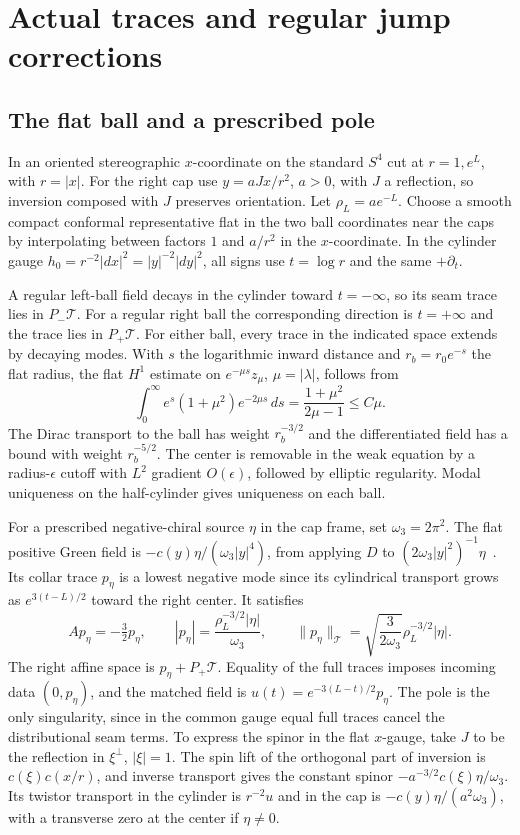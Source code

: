\documentclass[11pt]{article}
\theoremstyle{remark}
\begin{document}
\section{Actual traces and regular jump corrections}

\subsection{The flat ball and a prescribed pole}
In an oriented stereographic \(x\)-coordinate on the standard \(S^4\) cut at \(r=1,e^L\), with \(r=|x|\). For the right cap use \(y=aJx/r^2\), \(a>0\), with \(J\) a reflection, so inversion composed with \(J\) preserves orientation. Let \(\rho_L=ae^{-L}\). Choose a smooth compact conformal representative flat in the two ball coordinates near the caps by interpolating between factors \(1\) and \(a/r^2\) in the \(x\)-coordinate. In the cylinder gauge \(h_0=r^{-2}|dx|^2=|y|^{-2}|dy|^2\), all signs use \(t=\log r\) and the same \(+\partial_t\).

A regular left-ball field decays in the cylinder toward \(t=-\infty\), so its seam trace lies in \(P_-\mathcal T\). For a regular right ball the corresponding direction is \(t=+\infty\) and the trace lies in \(P_+\mathcal T\). For either ball, every trace in the indicated space extends by decaying modes. With \(s\) the logarithmic inward distance and \(r_b=r_0e^{-s}\) the flat radius, the flat \(H^1\) estimate on \(e^{-\mu s}z_\mu\), \(\mu=|\lambda|\), follows from
\[
 \int_0^\infty e^s(1+\mu^2)e^{-2\mu s}\,ds
       =\frac{1+\mu^2}{2\mu-1}\le C\mu .
\]
The Dirac transport to the ball has weight \(r_b^{-3/2}\) and the differentiated field has a bound with weight \(r_b^{-5/2}\). The center is removable in the weak equation by a radius-\(\epsilon\) cutoff with \(L^2\) gradient \(O(\epsilon)\), followed by elliptic regularity. Modal uniqueness on the half-cylinder gives uniqueness on each ball.

For a prescribed negative-chiral source \(\eta\) in the cap frame, set \(\omega_3=2\pi^2\). The flat positive Green field is \(-c(y)\eta/(\omega_3|y|^4)\), from applying \(D\) to \((2\omega_3|y|^2)^{-1}\eta\)~\cite[\S2.1 and Proposition~2.3]{AmmannHumbertMorel2006Mass}. Its collar trace \(p_\eta\) is a lowest negative mode since its cylindrical transport grows as \(e^{3(t-L)/2}\) toward the right center. It satisfies
\[
 Ap_\eta=-\tfrac32p_\eta,\qquad
 |p_\eta|=\frac{\rho_L^{-3/2}|\eta|}{\omega_3},\qquad
 \|p_\eta\|_{\mathcal T}=\sqrt{\frac{3}{2\omega_3}}\rho_L^{-3/2}|\eta| .
\]
The right affine space is \(p_\eta+P_+\mathcal T\). Equality of the full traces imposes incoming data \((0,p_\eta)\), and the matched field is
\(u(t)=e^{-3(L-t)/2}p_\eta\). The pole is the only singularity, since in the common gauge equal full traces cancel the distributional seam terms. To express the spinor in the flat \(x\)-gauge, take \(J\) to be the reflection in \(\xi^\perp\), \(|\xi|=1\). The spin lift of the orthogonal part of inversion is \(c(\xi)c(x/r)\), and inverse transport gives the constant spinor \(-a^{-3/2}c(\xi)\eta/\omega_3\). Its twistor transport in the cylinder is \(r^{-2}u\) and in the cap is \(-c(y)\eta/(a^2\omega_3)\), with a transverse zero at the center if \(\eta\ne0\).
\end{document}
